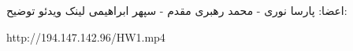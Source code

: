 \documentclass[12pt,a4paper]{article}
\begin{document}

اعضا: پارسا نوری - محمد رهبری مقدم - سپهر ابراهیمی
\newline
لینک ویدئو توضیح:
\newline
\begin{latin}
http://194.147.142.96/HW1.mp4
\end{latin}











\newpage







   
\end{document}
